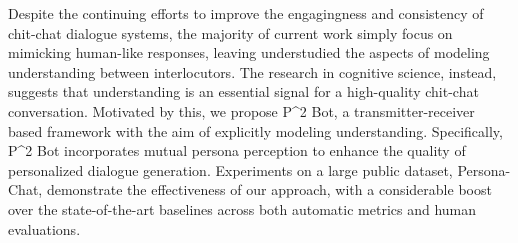 Despite the continuing efforts to improve the engagingness and consistency of chit-chat dialogue systems, the majority of current work simply focus on mimicking human-like responses, leaving understudied the aspects of modeling understanding between interlocutors. The research in cognitive science, instead, suggests that understanding is an essential signal for a high-quality chit-chat conversation. Motivated by this, we propose P{\^{}}2 Bot, a transmitter-receiver based framework with the aim of explicitly modeling understanding. Specifically, P{\^{}}2 Bot incorporates mutual persona perception to enhance the quality of personalized dialogue generation. Experiments on a large public dataset, Persona-Chat, demonstrate the effectiveness of our approach, with a considerable boost over the state-of-the-art baselines across both automatic metrics and human evaluations.

